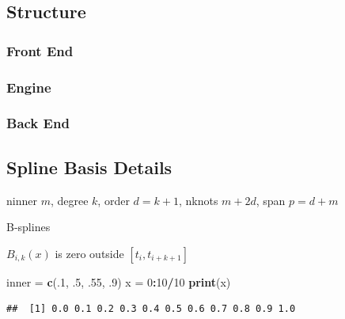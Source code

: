 \documentclass[
  12pt,
]{article}
\newenvironment{Shaded}{\begin{snugshade}}{\end{snugshade}}
\newcommand{\DecValTok}[1]{\textcolor[rgb]{0.00,0.00,0.81}{#1}}
\newcommand{\FunctionTok}[1]{\textcolor[rgb]{0.13,0.29,0.53}{\textbf{#1}}}
\newcommand{\NormalTok}[1]{#1}
\newcommand{\OtherTok}[1]{\textcolor[rgb]{0.56,0.35,0.01}{#1}}
\newcommand{\SpecialCharTok}[1]{\textcolor[rgb]{0.81,0.36,0.00}{\textbf{#1}}}
\begin{document}
\subsection{Structure}\label{structure}

\subsubsection{Front End}\label{front-end}

\subsubsection{Engine}\label{engine}

\subsubsection{Back End}\label{back-end}

\subsection{Spline Basis Details}\label{spline-basis-details}

ninner \(m\),
degree \(k\),
order \(d=k+1\),
nknots \(m + 2d\),
span \(p=d+m\)

B-splines

\(B_{i,k}(x)\) is zero outside \([t_i,t_{i+k+1}]\)

\begin{Shaded}
\begin{Highlighting}[]
\NormalTok{inner }\OtherTok{=} \FunctionTok{c}\NormalTok{(.}\DecValTok{1}\NormalTok{, .}\DecValTok{5}\NormalTok{, .}\DecValTok{55}\NormalTok{, .}\DecValTok{9}\NormalTok{)}
\NormalTok{x }\OtherTok{=} \DecValTok{0}\SpecialCharTok{:}\DecValTok{10}\SpecialCharTok{/}\DecValTok{10}
\FunctionTok{print}\NormalTok{(x)}
\end{Highlighting}
\end{Shaded}

\begin{verbatim}
##  [1] 0.0 0.1 0.2 0.3 0.4 0.5 0.6 0.7 0.8 0.9 1.0
\end{verbatim}
\end{document}
